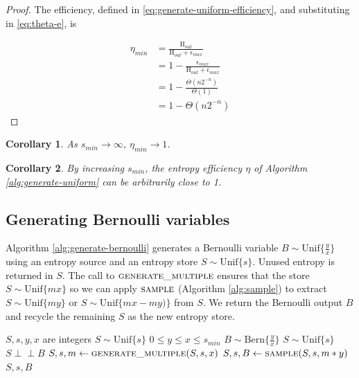 \documentclass[lettersize,journal]{IEEEtran}
\newtheorem{corollary}{Corollary}
\newcommand{\indep}{\perp\!\!\!\perp}
\newcommand{\unif}[1]{\mathrm{Unif}\{#1\}}
\newcommand{\bern}[1]{\mathrm{Bern}\{#1\}}
\newcommand{\Entropy}{\mathrm{H}}
\begin{document}
\begin{proof}
The efficiency, defined in \eqref{eq:generate-uniform-efficiency}, and substituting in \eqref{eq:theta-e}, is

\begin{align}
\eta_{min} 
    & = \frac{\Entropy_{out}}{\Entropy_{out} + \epsilon_{max}} \\
    & = 1 - \frac{\epsilon_{max}}{\Entropy_{out} + \epsilon_{max}} \\
    & = 1 - \frac{\Theta(n2^{-n})}{\Theta(1)} \\
    & = 1 - \Theta(n2^{-n})
\end{align}

\end{proof}

\begin{corollary}
    As $s_{min} \rightarrow \infty$, $\eta_{min} \rightarrow 1$.
\end{corollary}

\begin{corollary}
By increasing $s_{min}$, the entropy efficiency $\eta$ of Algorithm \ref{alg:generate-uniform} can be arbitrarily close to 1.
\end{corollary}


\subsection{Generating Bernoulli variables}

Algorithm \ref{alg:generate-bernoulli} generates a Bernoulli variable $B \sim \unif{\frac{y}{x}}$ using an entropy source and an entropy store $S \sim \unif{s}$. Unused entropy is returned in $S$. The call to $\textsc{generate\_multiple}$ ensures that the store $S \sim \unif{mx}$ so we can apply $\textsc{sample}$ (Algorithm \ref{alg:sample}) to extract $S \sim \unif{my}$ or $S \sim \unif{mx-my)}$ from $S$. We return the Bernoulli output $B$ and recycle the remaining $S$ as the new entropy store.

\begin{algorithm}
\caption{Generating a Bernoulli variable}
\label{alg:generate-bernoulli}
\begin{algorithmic}[1]
\Require $S, s, y, x$ are integers
\Require $S \sim \unif{s}$
\Require $0 \le y \le x\le s_{min}$
\Ensure $B \sim \bern{\frac{y}{x}}$
\Ensure $S \sim \unif{s}$
\Ensure $S \indep B$
  \State $S, s, m \gets \textsc{generate\_multiple}(S, s, x)$
  \State $S, s, B \gets \textsc{sample}(S, s, m * y)$
  \State \Return $S, s, B$
\EndProcedure
\end{algorithmic}
\end{algorithm}
\end{document}
